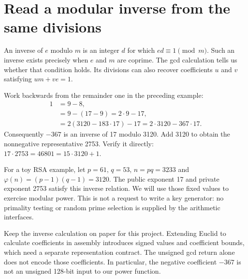 \section{Read a modular inverse from the same divisions}
An inverse of \(e\) modulo \(m\) is an integer \(d\) for which
\(ed\equiv1\pmod m\). Such an inverse exists precisely when \(e\) and \(m\) are
coprime. The gcd calculation tells us whether that condition holds. Its divisions can
also recover coefficients \(u\) and \(v\) satisfying \(um+ve=1\).

Work backwards from the remainder one in the preceding example:
\[
\begin{aligned}
1&=9-8,\\
 &=9-(17-9)=2\cdot9-17,\\
 &=2(3120-183\cdot17)-17=2\cdot3120-367\cdot17.
\end{aligned}
\]
Consequently \(-367\) is an inverse of 17 modulo 3120. Add 3120 to obtain the
nonnegative representative 2753. Verify it directly:
\(17\cdot2753=46801=15\cdot3120+1\).

For a toy RSA example, let \(p=61\), \(q=53\), \(n=pq=3233\) and
\(\varphi(n)=(p-1)(q-1)=3120\). The public exponent 17 and private exponent 2753
satisfy this inverse relation. We will use those fixed values to exercise modular
power. This is not a request to write a key generator: no primality testing or random
prime selection is supplied by the arithmetic interfaces.

Keep the inverse calculation on paper for this project. Extending Euclid to calculate
coefficients in assembly introduces signed values and coefficient bounds, which need
a separate representation contract. The unsigned gcd return alone does not encode
those coefficients. In particular, the negative coefficient \(-367\) is not an unsigned
128-bit input to our power function.
